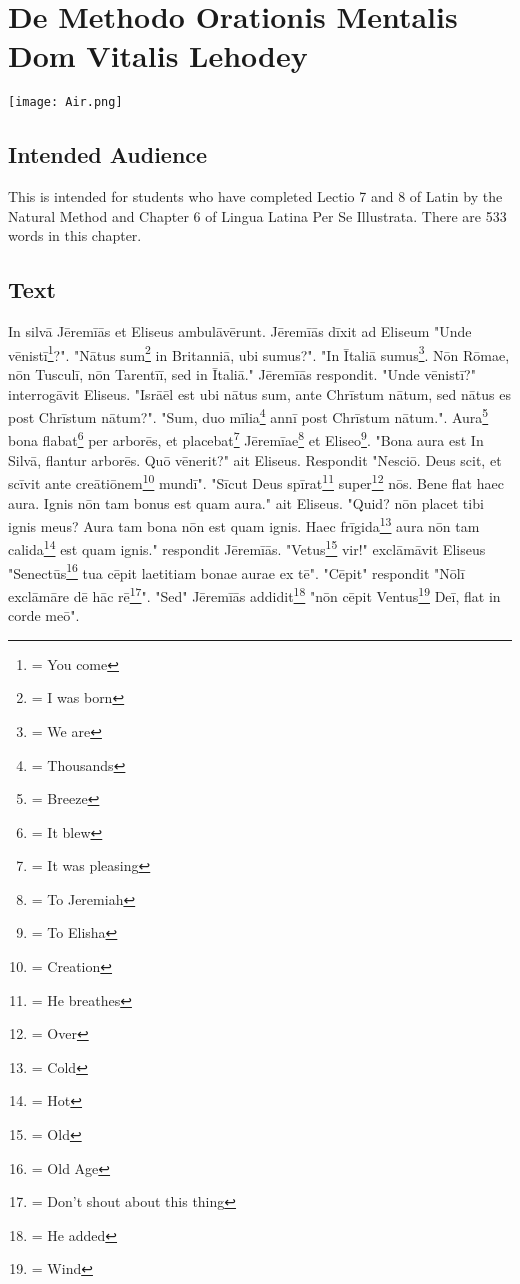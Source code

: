 \chapter{De Methodo Orationis Mentalis Dom Vitalis Lehodey}
\begin{center}
\texttt{[image: Air.png]}
\end{center}

\section{Intended Audience}
This is intended for students who have completed Lectio 7 and 8 of Latin by the Natural Method and Chapter 6 of Lingua Latina Per Se Illustrata. There are 533 words in this chapter.

\section{Text}
In silvā Jēremīās et Eliseus ambulāvērunt. Jēremīās dīxit ad Eliseum "Unde vēnistī\footnote{\textbf{} = You come}?". "Nātus sum\footnote{\textbf{} = I was born} in Britanniā, ubi sumus?". "In Ītaliā sumus\footnote{\textbf{} = We are}. Nōn Rōmae, nōn Tusculī, nōn Tarentīī, sed in Ītaliā." Jēremīās respondit. "Unde vēnistī?" interrogāvit Eliseus. "Isrāēl est ubi nātus sum, ante Chrīstum nātum, sed nātus es post Chrīstum nātum?". "Sum, duo mīlia\footnote{\textbf{} = Thousands} annī post Chrīstum nātum.". Aura\footnote{\textbf{} = Breeze} bona flabat\footnote{\textbf{} = It blew} per arborēs, et placebat\footnote{\textbf{} = It was pleasing} Jēremīae\footnote{\textbf{} = To Jeremiah} et Eliseo\footnote{\textbf{} = To Elisha}. "Bona aura est In Silvā, flantur arborēs.  Quō vēnerit?" ait Eliseus. Respondit "Nesciō. Deus scit, et scīvit ante creātiōnem\footnote{\textbf{} = Creation} mundī". "Sīcut Deus spīrat\footnote{\textbf{} = He breathes} super\footnote{\textbf{} = Over} nōs.  Bene flat haec aura. Ignis nōn tam bonus est quam aura." ait Eliseus. "Quid? nōn placet tibi ignis meus? Aura tam bona nōn est quam ignis. Haec frīgida\footnote{\textbf{} = Cold} aura nōn tam calida\footnote{\textbf{} = Hot} est quam ignis." respondit Jēremīās. "Vetus\footnote{\textbf{} = Old} vir!" exclāmāvit Eliseus "Senectūs\footnote{\textbf{} = Old Age} tua cēpit laetitiam bonae aurae ex tē". "Cēpit" respondit "Nōlī exclāmāre dē hāc rē\footnote{\textbf{} = Don't shout about this thing}". "Sed" Jēremīās addidit\footnote{\textbf{} = He added} "nōn cēpit Ventus\footnote{\textbf{} = Wind} Deī, flat in corde meō". 

